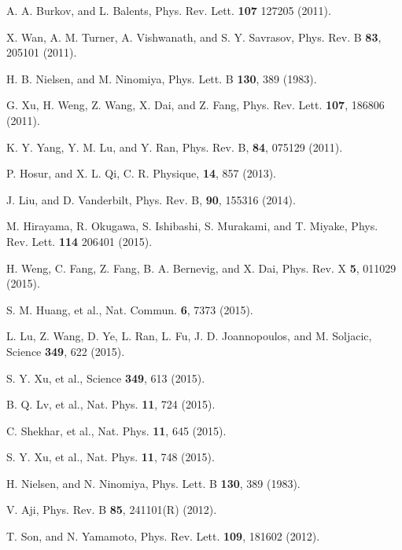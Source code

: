\documentclass[twocolumn,superscriptaddress]{revtex4}%
\begin{document}
\begin{thebibliography}{99}                                                                                               %


A. A. Burkov, and L. Balents, Phys. Rev. Lett.
\textbf{107} 127205 (2011).

X. Wan, A. M. Turner, A. Vishwanath, and S. Y.
Savrasov, Phys. Rev. B \textbf{83}, 205101 (2011).

H. B. Nielsen, and M. Ninomiya, Phys. Lett. B
\textbf{130}, 389 (1983).

G. Xu, H. Weng, Z. Wang, X. Dai, and Z. Fang, Phys. Rev.
Lett. \textbf{107}, 186806 (2011).

K. Y. Yang, Y. M. Lu, and Y. Ran, Phys. Rev. B,
\textbf{84}, 075129 (2011).

P. Hosur, and X. L. Qi, C. R. Physique, \textbf{14}, 857 (2013).

J. Liu, and D. Vanderbilt, Phys. Rev. B,
\textbf{90}, 155316 (2014).

M. Hirayama, R. Okugawa, S. Ishibashi, S. Murakami, and
T. Miyake, Phys. Rev. Lett. \textbf{114} 206401 (2015).

H. Weng, C. Fang, Z. Fang, B. A. Bernevig, and X. Dai,
Phys. Rev. X \textbf{5}, 011029 (2015).

S. M. Huang, et al., Nat. Commun. \textbf{6}, 7373 (2015).

L. Lu, Z. Wang, D. Ye, L. Ran, L. Fu, J. D.
Joannopoulos, and M. Soljacic, Science \textbf{349}, 622 (2015).

S. Y. Xu, et al., Science \textbf{349}, 613 (2015).

B. Q. Lv, et al., Nat. Phys. \textbf{11}, 724 (2015).

C. Shekhar, et al., Nat. Phys. \textbf{11}, 645 (2015).

S. Y. Xu, et al., Nat. Phys. \textbf{11}, 748 (2015).

H. Nielsen, and N. Ninomiya, Phys. Lett. B
\textbf{130}, 389 (1983).

V. Aji, Phys. Rev. B \textbf{85}, 241101(R) (2012).

T. Son, and N. Yamamoto, Phys. Rev. Lett.
\textbf{109}, 181602 (2012).


\end{thebibliography}
\end{document}
